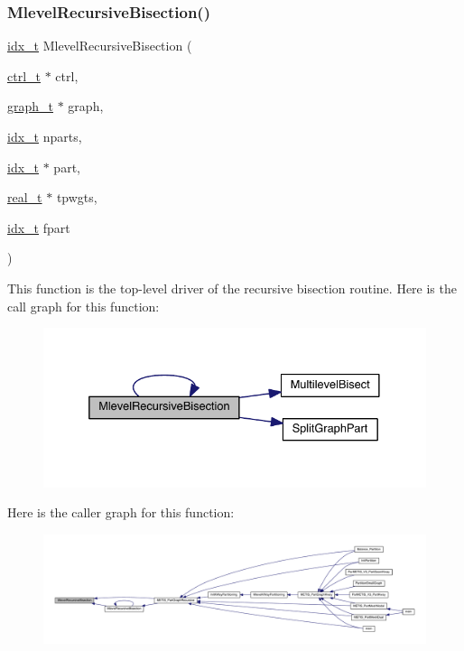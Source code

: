 \subsubsection{\texorpdfstring{Mlevel\+Recursive\+Bisection()}{MlevelRecursiveBisection()}}
{\footnotesize\ttfamily \hyperlink{a00876_aaa5262be3e700770163401acb0150f52}{idx\+\_\+t} Mlevel\+Recursive\+Bisection (\begin{DoxyParamCaption}\item[{\hyperlink{a00742}{ctrl\+\_\+t} $\ast$}]{ctrl,  }\item[{\hyperlink{a00734}{graph\+\_\+t} $\ast$}]{graph,  }\item[{\hyperlink{a00876_aaa5262be3e700770163401acb0150f52}{idx\+\_\+t}}]{nparts,  }\item[{\hyperlink{a00876_aaa5262be3e700770163401acb0150f52}{idx\+\_\+t} $\ast$}]{part,  }\item[{\hyperlink{a00876_a1924a4f6907cc3833213aba1f07fcbe9}{real\+\_\+t} $\ast$}]{tpwgts,  }\item[{\hyperlink{a00876_aaa5262be3e700770163401acb0150f52}{idx\+\_\+t}}]{fpart }\end{DoxyParamCaption})}

This function is the top-\/level driver of the recursive bisection routine. Here is the call graph for this function\+:\nopagebreak
\begin{figure}[H]
\begin{center}
\leavevmode
\includegraphics[width=332pt]{a00260_a5510f276b321a8450b2e9cc913c2f00f_cgraph}
\end{center}
\end{figure}
Here is the caller graph for this function\+:\nopagebreak
\begin{figure}[H]
\begin{center}
\leavevmode
\includegraphics[width=350pt]{a00260_a5510f276b321a8450b2e9cc913c2f00f_icgraph}
\end{center}
\end{figure}
\mbox{\label{a00260_a33c48a23cc94ea0221fa5c7317cd0222}} 
